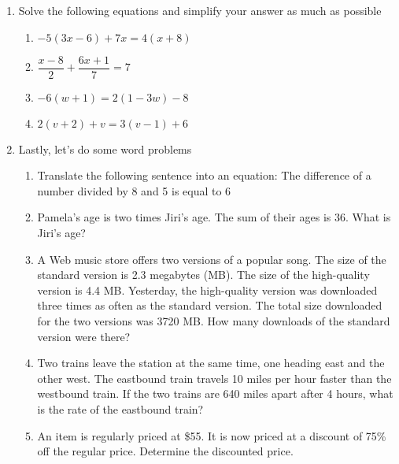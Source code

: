 \documentclass[fleqn]{article}
\begin{document}
\begin{enumerate}
   \item Solve the following equations and simplify your answer as much as possible

  \begin{enumerate}
	 \item $-5(3x - 6) + 7x = 4(x+8)$ \answer

	 \item $\dfrac{x-8}{2} + \dfrac{6x + 1}{7} = 7$ \answer

	 \item $-6(w+1) = 2(1-3w) - 8$ \answer

\newpage

	 \item $2(v+2) + v = 3(v-1) + 6$ \answer

      \end{enumerate}

\item Lastly, let's do some word problems

\begin{enumerate}

	 \item Translate the following sentence into an equation: The difference of a number divided by 8 and 5 is equal to 6 \answer

	 \item Pamela's age is two times Jiri's age. The sum of their ages is  36. What is Jiri's age? \answer

\newpage

\item A Web music store offers two versions of a popular song. The size of the standard version is 2.3 megabytes (MB). The size of the high-quality version is 4.4 MB. Yesterday, the high-quality version was downloaded three times as often as the standard version. The total size downloaded for the two versions was 3720 MB. How many downloads of the standard version were there? \answer

\item Two trains leave the station at the same time, one heading east and the other west. The eastbound train travels 10  miles per hour faster than the westbound train. If the two trains are 640 miles apart after 4  hours, what is the rate of the eastbound train? \answer

\item An item is regularly priced at \$55. It is now priced at a discount of 75\%  off the regular price. Determine the discounted price. \answer


\end{enumerate}

    

\end{enumerate}
\end{document}
